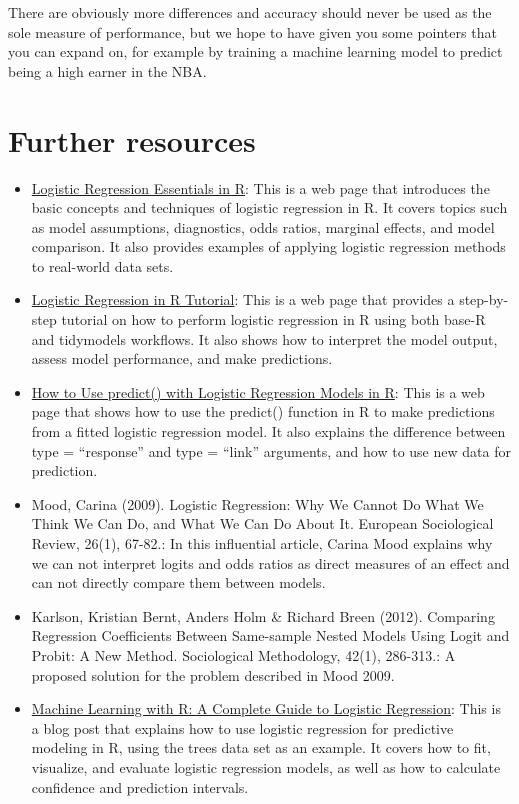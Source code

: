 \documentclass[
]{book}
\providecommand{\tightlist}{%
  \setlength{\itemsep}{0pt}\setlength{\parskip}{0pt}}
\begin{document}
There are obviously more differences and accuracy should never be used as the
sole measure of performance, but we hope to have given you some pointers that
you can expand on, for example by training a machine learning model to predict
being a high earner in the NBA.

\hypertarget{further-resources-4}{%
\section{Further resources}\label{further-resources-4}}

\begin{itemize}
\tightlist
\item
  \href{http://sthda.com/english/articles/36-classification-methods-essentials/151-logistic-regression-essentials-in-r/}{Logistic Regression Essentials in
  R}:
  This is a web page that introduces the basic concepts and techniques
  of logistic regression in R. It covers topics such as model
  assumptions, diagnostics, odds ratios, marginal effects, and model
  comparison. It also provides examples of applying logistic
  regression methods to real-world data sets.
\item
  \href{https://www.datacamp.com/tutorial/logistic-regression-R}{Logistic Regression in R
  Tutorial}:
  This is a web page that provides a step-by-step tutorial on how to
  perform logistic regression in R using both base-R and tidymodels
  workflows. It also shows how to interpret the model output, assess
  model performance, and make predictions.
\item
  \href{https://www.statology.org/r-logistic-regression-predict/}{How to Use predict() with Logistic Regression Models in
  R}: This
  is a web page that shows how to use the predict() function in R to
  make predictions from a fitted logistic regression model. It also
  explains the difference between type = ``response'' and type = ``link''
  arguments, and how to use new data for prediction.
\item
  Mood, Carina (2009). Logistic Regression: Why We Cannot Do What We Think We
  Can Do, and What We Can Do About It. European Sociological Review, 26(1),
  67-82.: In this influential article, Carina Mood explains why we can not
  interpret logits and odds ratios as direct measures of an effect and can not
  directly compare them between models.
\item
  Karlson, Kristian Bernt, Anders Holm \& Richard Breen (2012). Comparing
  Regression Coefficients Between Same-sample Nested Models Using Logit and
  Probit: A New Method. Sociological Methodology, 42(1), 286-313.: A proposed
  solution for the problem described in Mood 2009.
\item
  \href{https://www.r-bloggers.com/2021/01/machine-learning-with-r-a-complete-guide-to-logistic-regression/}{Machine Learning with R: A Complete Guide to Logistic
  Regression}:
  This is a blog post that explains how to use logistic regression for
  predictive modeling in R, using the trees data set as an example. It
  covers how to fit, visualize, and evaluate logistic regression models,
  as well as how to calculate confidence and prediction intervals.
\end{itemize}

  
\end{document}
